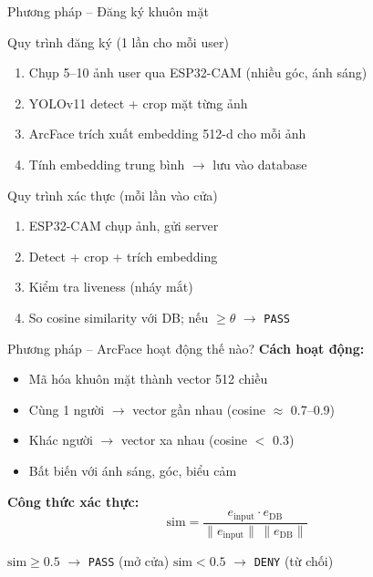 \documentclass[aspectratio=169]{beamer}
\begin{document}
\begin{frame}{Phương pháp -- Đăng ký khuôn mặt}
  \begin{block}{Quy trình đăng ký (1 lần cho mỗi user)}
    \begin{enumerate}
      \item Chụp 5--10 ảnh user qua ESP32-CAM (nhiều góc, ánh sáng)
      \item YOLOv11 detect + crop mặt từng ảnh
      \item ArcFace trích xuất embedding 512-d cho mỗi ảnh
      \item Tính embedding trung bình $\to$ lưu vào database
    \end{enumerate}
  \end{block}

  \vspace{0.6em}
  \begin{block}{Quy trình xác thực (mỗi lần vào cửa)}
    \begin{enumerate}
      \item ESP32-CAM chụp ảnh, gửi server
      \item Detect + crop + trích embedding
      \item Kiểm tra liveness (nháy mắt)
      \item So cosine similarity với DB; nếu $\geq \theta$ $\to$ \texttt{PASS}
    \end{enumerate}
  \end{block}
\end{frame}

\begin{frame}{Phương pháp -- ArcFace hoạt động thế nào?}
  \textbf{Cách hoạt động:}
  \begin{itemize}
    \item Mã hóa khuôn mặt thành vector 512 chiều
    \item Cùng 1 người $\to$ vector gần nhau (cosine $\approx$ 0.7--0.9)
    \item Khác người $\to$ vector xa nhau (cosine $<$ 0.3)
    \item Bất biến với ánh sáng, góc, biểu cảm
  \end{itemize}

  \vspace{0.5em}
  \textbf{Công thức xác thực:}
  \[
    \text{sim} = \frac{e_{\text{input}} \cdot e_{\text{DB}}}{\lVert e_{\text{input}} \rVert \, \lVert e_{\text{DB}} \rVert}
  \]

  \vspace{0.3em}
  $\text{sim} \geq 0.5$ $\to$ \texttt{PASS} (mở cửa) \qquad $\text{sim} < 0.5$ $\to$ \texttt{DENY} (từ chối)
\end{frame}
\end{document}
